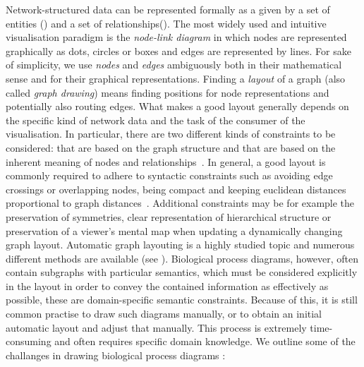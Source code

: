 \documentclass[
	fontsize=10pt, %
	twoside=true, %
	secnumdepth=1, %
  toc=indentunnumbered %
]{kaobook}
\begin{document}
Network-structured data can be represented formally as a  given by a
set of entities () and a set of relationships().
%
The most widely used and intuitive visualisation paradigm is the
\textit{node-link diagram} in which nodes are represented graphically as dots,
circles or boxes and edges are represented by lines. For sake of simplicity, we
use \textit{nodes} and \textit{edges} ambiguously both in their mathematical
sense and for their graphical representations.
%
Finding a \textit{layout} of a graph (also called \textit{graph drawing}) means
finding positions for node representations and potentially also routing edges.
%
What makes a good layout generally depends on the specific kind of network data
and the task of the consumer of the visualisation. In particular, there are two
different kinds of constraints to be considered: 
that are based on the graph structure and  that are
based on the inherent meaning of nodes and
relationships~\cite{coleman_AestheticsbasedGraphLayout_1996}.
%
In general, a good layout is commonly required to adhere to syntactic
constraints such as avoiding edge crossings or overlapping nodes, being compact
and keeping euclidean distances proportional to graph
distances~\cite{coleman_AestheticsbasedGraphLayout_1996}. Additional constraints
may be for example the preservation of symmetries, clear representation of
hierarchical structure or preservation of a viewer's mental map when updating a
dynamically changing graph layout.
%
Automatic graph layouting is a highly studied topic and numerous different
methods are available (see ).
%
Biological process diagrams, however, often contain subgraphs with particular
semantics, which must be considered explicitly in the layout in order to convey
the contained information as effectively as possible, these are domain-specific
semantic constraints. Because of this, it is still common practise to draw such
diagrams manually, or to obtain an initial automatic layout and adjust that
manually. This process is extremely time-consuming and often requires specific
domain knowledge. We outline some of the challanges in drawing biological
process diagrams \cite{bourqui_MetabolicNetworkVisualization_2007,
  siebenhaller_HumanlikeLayoutAlgorithms_2020,
  wu_MetabopolisScalableNetwork_2019}:

\end{document}
